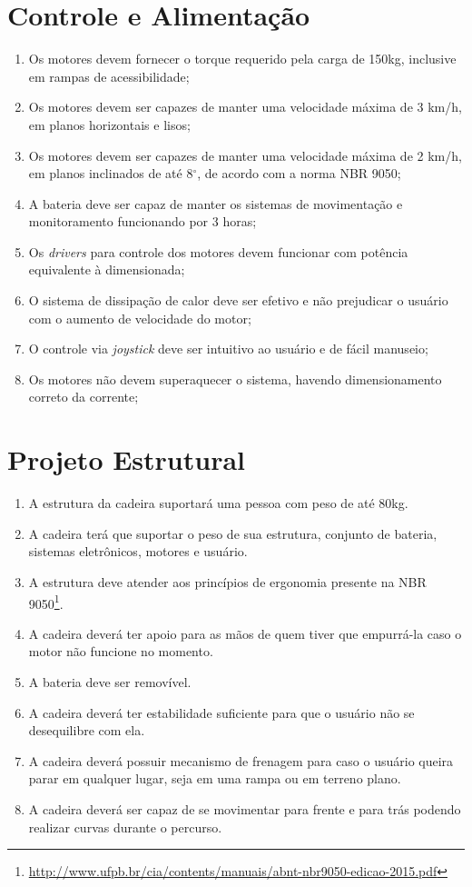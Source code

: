 \section{Controle e Alimentação}
\begin{enumerate}[resume*]
\item Os motores devem fornecer o torque requerido pela carga de 150kg, inclusive em rampas de acessibilidade;
\item Os motores devem ser capazes de manter uma velocidade máxima de 3 km/h, em planos horizontais e lisos;
\item Os motores devem ser capazes de manter uma velocidade máxima de 2 km/h, em planos inclinados de
    até 8$^{\circ}$, de acordo com a norma NBR 9050;
\item A bateria deve ser capaz de manter os sistemas de movimentação e monitoramento funcionando por 3 horas;
\item Os \textit{drivers} para controle dos motores devem funcionar com potência equivalente à dimensionada;
\item O sistema de dissipação de calor deve ser efetivo e não prejudicar o usuário com o aumento de velocidade do motor;
\item O controle via \textit{joystick} deve ser intuitivo ao usuário e de fácil manuseio;
\item Os motores não devem superaquecer o sistema, havendo dimensionamento correto da corrente;
\end{enumerate}

\section{Projeto Estrutural}

\begin{enumerate}[resume*]
  \item A estrutura da cadeira suportará uma pessoa com peso de até 80kg.
  \item A cadeira terá que suportar o peso de sua estrutura, conjunto de bateria,
      sistemas eletrônicos, motores e usuário.
  \item A estrutura deve atender aos princípios de ergonomia presente na NBR
    9050\footnote{\url{http://www.ufpb.br/cia/contents/manuais/abnt-nbr9050-edicao-2015.pdf}}.
  \item A cadeira deverá ter apoio para as mãos de quem tiver que empurrá-la
    caso o motor não funcione no momento.
  \item A bateria deve ser removível.
  \item A cadeira deverá ter estabilidade suficiente para que o usuário não se
    desequilibre com ela.
  \item A cadeira deverá possuir mecanismo de frenagem para caso o usuário
    queira parar em qualquer lugar, seja em uma rampa ou em terreno plano.
  \item A cadeira deverá ser capaz de se movimentar para frente e para trás
    podendo realizar curvas durante o percurso.
\end{enumerate}

